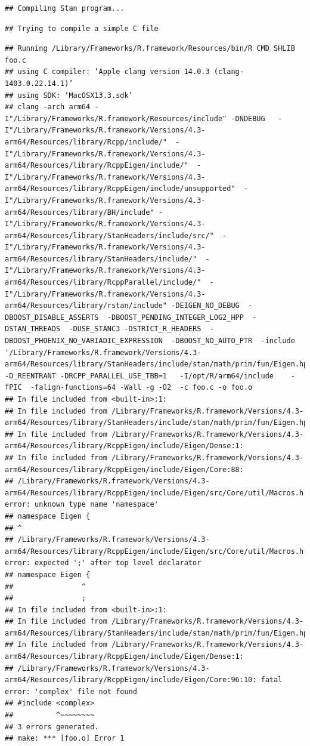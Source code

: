 \documentclass[
]{article}
\begin{document}
\begin{verbatim}
## Compiling Stan program...
\end{verbatim}

\begin{verbatim}
## Trying to compile a simple C file
\end{verbatim}

\begin{verbatim}
## Running /Library/Frameworks/R.framework/Resources/bin/R CMD SHLIB foo.c
## using C compiler: ‘Apple clang version 14.0.3 (clang-1403.0.22.14.1)’
## using SDK: ‘MacOSX13.3.sdk’
## clang -arch arm64 -I"/Library/Frameworks/R.framework/Resources/include" -DNDEBUG   -I"/Library/Frameworks/R.framework/Versions/4.3-arm64/Resources/library/Rcpp/include/"  -I"/Library/Frameworks/R.framework/Versions/4.3-arm64/Resources/library/RcppEigen/include/"  -I"/Library/Frameworks/R.framework/Versions/4.3-arm64/Resources/library/RcppEigen/include/unsupported"  -I"/Library/Frameworks/R.framework/Versions/4.3-arm64/Resources/library/BH/include" -I"/Library/Frameworks/R.framework/Versions/4.3-arm64/Resources/library/StanHeaders/include/src/"  -I"/Library/Frameworks/R.framework/Versions/4.3-arm64/Resources/library/StanHeaders/include/"  -I"/Library/Frameworks/R.framework/Versions/4.3-arm64/Resources/library/RcppParallel/include/"  -I"/Library/Frameworks/R.framework/Versions/4.3-arm64/Resources/library/rstan/include" -DEIGEN_NO_DEBUG  -DBOOST_DISABLE_ASSERTS  -DBOOST_PENDING_INTEGER_LOG2_HPP  -DSTAN_THREADS  -DUSE_STANC3 -DSTRICT_R_HEADERS  -DBOOST_PHOENIX_NO_VARIADIC_EXPRESSION  -DBOOST_NO_AUTO_PTR  -include '/Library/Frameworks/R.framework/Versions/4.3-arm64/Resources/library/StanHeaders/include/stan/math/prim/fun/Eigen.hpp'  -D_REENTRANT -DRCPP_PARALLEL_USE_TBB=1   -I/opt/R/arm64/include    -fPIC  -falign-functions=64 -Wall -g -O2  -c foo.c -o foo.o
## In file included from <built-in>:1:
## In file included from /Library/Frameworks/R.framework/Versions/4.3-arm64/Resources/library/StanHeaders/include/stan/math/prim/fun/Eigen.hpp:22:
## In file included from /Library/Frameworks/R.framework/Versions/4.3-arm64/Resources/library/RcppEigen/include/Eigen/Dense:1:
## In file included from /Library/Frameworks/R.framework/Versions/4.3-arm64/Resources/library/RcppEigen/include/Eigen/Core:88:
## /Library/Frameworks/R.framework/Versions/4.3-arm64/Resources/library/RcppEigen/include/Eigen/src/Core/util/Macros.h:628:1: error: unknown type name 'namespace'
## namespace Eigen {
## ^
## /Library/Frameworks/R.framework/Versions/4.3-arm64/Resources/library/RcppEigen/include/Eigen/src/Core/util/Macros.h:628:16: error: expected ';' after top level declarator
## namespace Eigen {
##                ^
##                ;
## In file included from <built-in>:1:
## In file included from /Library/Frameworks/R.framework/Versions/4.3-arm64/Resources/library/StanHeaders/include/stan/math/prim/fun/Eigen.hpp:22:
## In file included from /Library/Frameworks/R.framework/Versions/4.3-arm64/Resources/library/RcppEigen/include/Eigen/Dense:1:
## /Library/Frameworks/R.framework/Versions/4.3-arm64/Resources/library/RcppEigen/include/Eigen/Core:96:10: fatal error: 'complex' file not found
## #include <complex>
##          ^~~~~~~~~
## 3 errors generated.
## make: *** [foo.o] Error 1
\end{verbatim}
\end{document}
